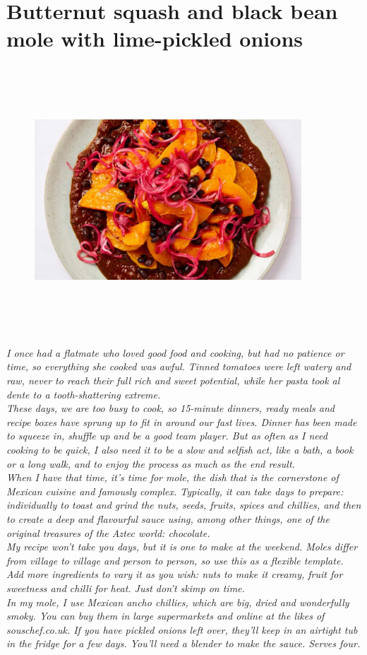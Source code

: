 \documentclass{book}
\begin{document}
\section{Butternut squash and black bean mole with lime-pickled onions}
\begin{figure}
\centering\includegraphics[width=10cm,height=10cm,keepaspectratio]{Recipe_Pictures/Butternut_squash_and_black_bean_mole_with_lime-pickled_onions.png}
\end{figure}
\emph{I once had a flatmate who loved good food and cooking, but had no patience or time, so everything she cooked was awful. Tinned tomatoes were left watery and raw, never to reach their full rich and sweet potential, while her pasta took al dente to a tooth-shattering extreme.\\ 
These days, we are too busy to cook, so 15-minute dinners, ready meals and recipe boxes have sprung up to fit in around our fast lives. Dinner has been made to squeeze in, shuffle up and be a good team player. But as often as I need cooking to be quick, I also need it to be a slow and selfish act, like a bath, a book or a long walk, and to enjoy the process as much as the end result.\\ 
When I have that time, it’s time for mole, the dish that is the cornerstone of Mexican cuisine and famously complex. Typically, it can take days to prepare: individually to toast and grind the nuts, seeds, fruits, spices and chillies, and then to create a deep and flavourful sauce using, among other things, one of the original treasures of the Aztec world: chocolate.\\ 
My recipe won’t take you days, but it is one to make at the weekend. Moles differ from village to village and person to person, so use this as a flexible template. Add more ingredients to vary it as you wish: nuts to make it creamy, fruit for sweetness and chilli for heat. Just don’t skimp on time.\\ 
In my mole, I use Mexican ancho chillies, which are big, dried and wonderfully smoky. You can buy them in large supermarkets and online at the likes of souschef.co.uk. If you have pickled onions left over, they’ll keep in an airtight tub in the fridge for a few days. You’ll need a blender to make the sauce. Serves four.}\\\\ 
\end{document}
